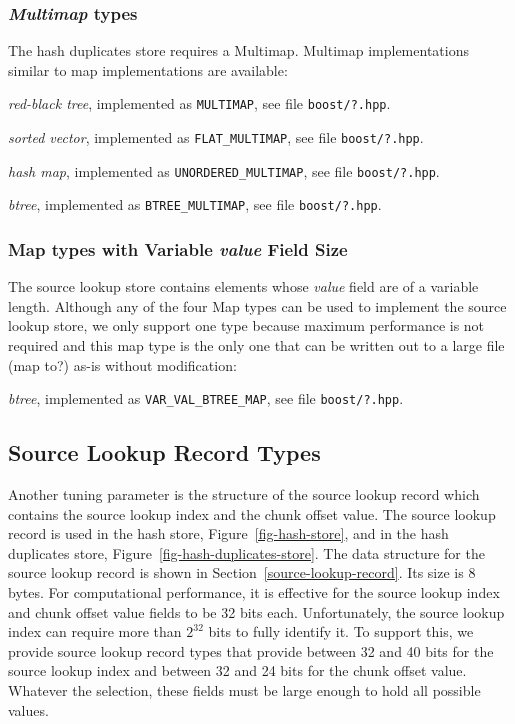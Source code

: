 \documentclass[10pt,twoside]{article}
\begin{document}
\subsubsection{\emph{Multimap} types\label{tuning-multimap-type}}
The hash duplicates store requires a Multimap.
Multimap implementations similar to map implementations are available:
\begin{compactitem}
\item \emph{red-black tree}, implemented as \texttt{MULTIMAP}, see file \texttt{boost/?.hpp}.
\item \emph{sorted vector}, implemented as \texttt{FLAT\_MULTIMAP}, see file \texttt{boost/?.hpp}.
\item \emph{hash map}, implemented as \texttt{UNORDERED\_MULTIMAP}, see file \texttt{boost/?.hpp}.
\item \emph{btree}, implemented as \texttt{BTREE\_MULTIMAP}, see file \texttt{boost/?.hpp}.
\end{compactitem}

\subsubsection{Map types with Variable \emph{value} Field Size}
The source lookup store
contains elements whose \emph{value} field are of a variable length.
Although any of the four Map types can be used to implement the source lookup store,
we only support one type because
maximum performance is not required
and this map type is the only one that can be written out to a large file (map to?)
as-is without modification:
\begin{compactitem}
\item \emph{btree}, implemented as \texttt{VAR\_VAL\_BTREE\_MAP}, see file \texttt{boost/?.hpp}.
\end{compactitem}

\subsection{Source Lookup Record Types\label{tuning-source-lookup-record-type}}
Another tuning parameter is the structure of the source lookup record
which contains the source lookup index and the chunk offset value.
The source lookup record is used in the hash store, Figure~\ref{fig-hash-store},
and in the hash duplicates store, Figure~\ref{fig-hash-duplicates-store}.
The data structure for the source lookup record is shown in Section~\ref{source-lookup-record}.
Its size is 8 bytes.
For computational performance,
it is effective for the source lookup index and chunk offset value fields
to be 32 bits each.
Unfortunately, the source lookup index can require more than \begin{math}2^{32}\end{math} bits
to fully identify it.
To support this, we provide source lookup record types that provide
between 32 and 40 bits for the source lookup index
and between 32 and 24 bits for the chunk offset value.
Whatever the selection, these fields must be large enough to hold all possible values.
\end{document}
